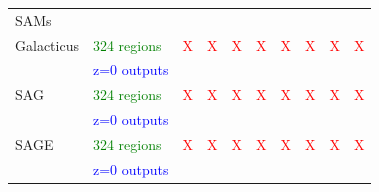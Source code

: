 \documentclass[aspectratio=43]{beamer}
\begin{document}
\begin{frame}
\begin{table}
\begin{tabular}{llllllllll}
      \hdashline
      SAMs &&&&&&&&&\\
      Galacticus& \textcolor{green}{324 regions} & \textcolor{red}{X} & \textcolor{red}{X} & \textcolor{red}{X} & \textcolor{red}{X} & \textcolor{red}{X} & \textcolor{red}{X} & \textcolor{red}{X} & \textcolor{red}{X}\\
      &\textcolor{blue}{z=0 outputs}&&&&&&&&\\
      SAG & \textcolor{green}{324 regions} & \textcolor{red}{X} & \textcolor{red}{X} & \textcolor{red}{X} & \textcolor{red}{X} & \textcolor{red}{X} & \textcolor{red}{X} & \textcolor{red}{X} & \textcolor{red}{X}\\
      &\textcolor{blue}{z=0 outputs}&&&&&&&&\\
      SAGE & \textcolor{green}{324 regions} & \textcolor{red}{X} & \textcolor{red}{X} & \textcolor{red}{X} & \textcolor{red}{X} & \textcolor{red}{X} & \textcolor{red}{X} & \textcolor{red}{X} & \textcolor{red}{X}\\
      &\textcolor{blue}{z=0 outputs}&&&&&&&&\\
      \hline
    \end{tabular}
  \end{table}
\end{frame}
\end{document}
